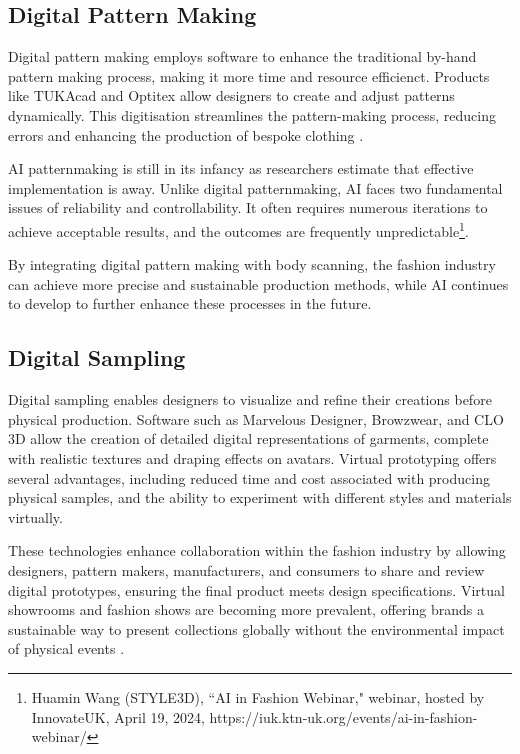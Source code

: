 \subsection{Digital Pattern Making}
Digital pattern making employs software to enhance the traditional by-hand pattern making process, making it more time and resource efficienct. Products like TUKAcad \cite{tukatech_about_nodate} and Optitex \cite{noauthor_2d3d_nodate} allow designers to create and adjust patterns dynamically. This digitisation streamlines the pattern-making process, reducing errors and enhancing the production of bespoke clothing \cite{kim_garment_2003,lei_new_2022}.

AI patternmaking is still in its infancy as researchers estimate that effective implementation is  away. Unlike digital patternmaking, AI faces two fundamental issues of reliability and controllability. It often requires numerous iterations to achieve acceptable results, and the outcomes are frequently unpredictable\footnote{Huamin Wang (STYLE3D), ``AI in Fashion Webinar," webinar, hosted by InnovateUK, April 19, 2024, https://iuk.ktn-uk.org/events/ai-in-fashion-webinar/}.

By integrating digital pattern making with body scanning, the fashion industry can achieve more precise and sustainable production methods, while AI continues to develop to further enhance these processes in the future.

\subsection{Digital Sampling}
Digital sampling enables designers to visualize and refine their creations before physical production. Software such as Marvelous Designer, Browzwear, and CLO 3D \cite{noauthor_2d_2024} allow the creation of detailed digital representations of garments, complete with realistic textures and draping effects on avatars. Virtual prototyping offers several advantages, including reduced time and cost associated with producing physical samples, and the ability to experiment with different styles and materials virtually.

These technologies enhance collaboration within the fashion industry by allowing designers, pattern makers, manufacturers, and consumers to share and review digital prototypes, ensuring the final product meets design specifications. Virtual showrooms and fashion shows are becoming more prevalent, offering brands a sustainable way to present collections globally without the environmental impact of physical events \cite{seymour_fashionable_2009}.

